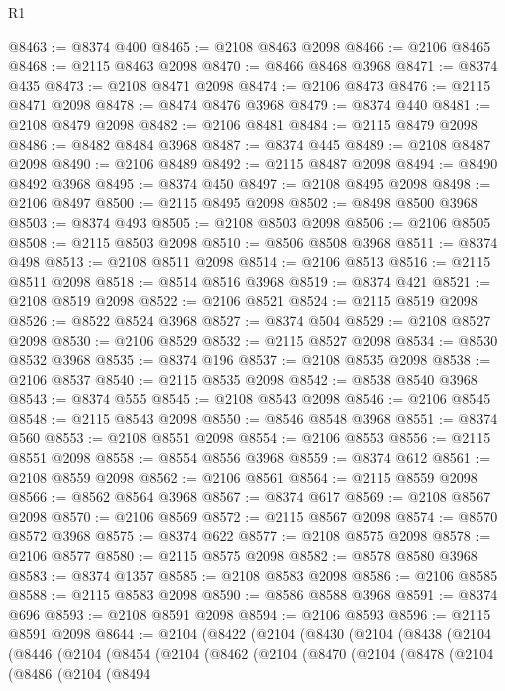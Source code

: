 \begin{lexlean}{R1}
\begin{coremodule}
@8463 := @8374 @400
@8465 := @2108 @8463 @2098
@8466 := @2106 @8465
@8468 := @2115 @8463 @2098
@8470 := @8466 @8468 @3968
@8471 := @8374 @435
@8473 := @2108 @8471 @2098
@8474 := @2106 @8473
@8476 := @2115 @8471 @2098
@8478 := @8474 @8476 @3968
@8479 := @8374 @440
@8481 := @2108 @8479 @2098
@8482 := @2106 @8481
@8484 := @2115 @8479 @2098
@8486 := @8482 @8484 @3968
@8487 := @8374 @445
@8489 := @2108 @8487 @2098
@8490 := @2106 @8489
@8492 := @2115 @8487 @2098
@8494 := @8490 @8492 @3968
@8495 := @8374 @450
@8497 := @2108 @8495 @2098
@8498 := @2106 @8497
@8500 := @2115 @8495 @2098
@8502 := @8498 @8500 @3968
@8503 := @8374 @493
@8505 := @2108 @8503 @2098
@8506 := @2106 @8505
@8508 := @2115 @8503 @2098
@8510 := @8506 @8508 @3968
@8511 := @8374 @498
@8513 := @2108 @8511 @2098
@8514 := @2106 @8513
@8516 := @2115 @8511 @2098
@8518 := @8514 @8516 @3968
@8519 := @8374 @421
@8521 := @2108 @8519 @2098
@8522 := @2106 @8521
@8524 := @2115 @8519 @2098
@8526 := @8522 @8524 @3968
@8527 := @8374 @504
@8529 := @2108 @8527 @2098
@8530 := @2106 @8529
@8532 := @2115 @8527 @2098
@8534 := @8530 @8532 @3968
@8535 := @8374 @196
@8537 := @2108 @8535 @2098
@8538 := @2106 @8537
@8540 := @2115 @8535 @2098
@8542 := @8538 @8540 @3968
@8543 := @8374 @555
@8545 := @2108 @8543 @2098
@8546 := @2106 @8545
@8548 := @2115 @8543 @2098
@8550 := @8546 @8548 @3968
@8551 := @8374 @560
@8553 := @2108 @8551 @2098
@8554 := @2106 @8553
@8556 := @2115 @8551 @2098
@8558 := @8554 @8556 @3968
@8559 := @8374 @612
@8561 := @2108 @8559 @2098
@8562 := @2106 @8561
@8564 := @2115 @8559 @2098
@8566 := @8562 @8564 @3968
@8567 := @8374 @617
@8569 := @2108 @8567 @2098
@8570 := @2106 @8569
@8572 := @2115 @8567 @2098
@8574 := @8570 @8572 @3968
@8575 := @8374 @622
@8577 := @2108 @8575 @2098
@8578 := @2106 @8577
@8580 := @2115 @8575 @2098
@8582 := @8578 @8580 @3968
@8583 := @8374 @1357
@8585 := @2108 @8583 @2098
@8586 := @2106 @8585
@8588 := @2115 @8583 @2098
@8590 := @8586 @8588 @3968
@8591 := @8374 @696
@8593 := @2108 @8591 @2098
@8594 := @2106 @8593
@8596 := @2115 @8591 @2098
@8644 := @2104
    (@8422
      (@2104
        (@8430
          (@2104
            (@8438
              (@2104
                (@8446
                  (@2104
                    (@8454
                      (@2104
                        (@8462
                          (@2104
                            (@8470
                              (@2104
                                (@8478
                                  (@2104
                                    (@8486
                                      (@2104
                                        (@8494

\end{coremodule}
\end{lexlean}
